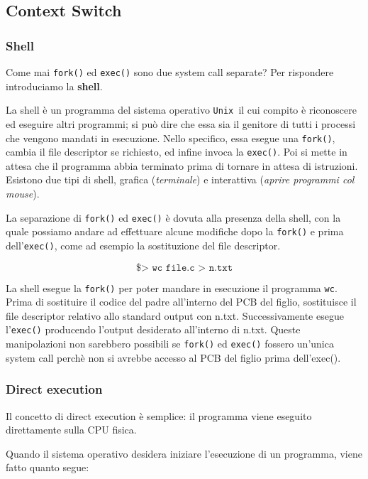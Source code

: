 \documentclass[12pt, letterpaper]{article}
\begin{document}
		\subsection{Context Switch}
		
			\subsubsection{Shell}
				
				Come mai \texttt{fork()} ed \texttt{exec()} sono due system call separate? Per rispondere introduciamo la \textbf{shell}.
				
				La shell è un programma del sistema operativo \texttt{Unix }il cui compito è riconoscere ed eseguire altri programmi; si può dire che essa sia il genitore di tutti i processi che vengono mandati in esecuzione. Nello specifico, essa esegue una \texttt{fork()}, cambia il file descriptor se richiesto, ed infine invoca la \texttt{exec()}. Poi si mette in attesa che il programma abbia terminato prima di tornare in attesa di istruzioni. Esistono due tipi di shell, grafica (\textit{terminale}) e interattiva (\textit{aprire programmi col mouse}). 
				
				La separazione di \texttt{fork()} ed \texttt{exec()} è dovuta alla presenza della shell, con la quale possiamo andare ad effettuare alcune modifiche dopo la \texttt{fork()} e prima dell'\texttt{exec()}, come ad esempio la sostituzione del file descriptor. 
				
				$$\texttt{\$> wc file.c > n.txt}$$
				
				La shell esegue la \texttt{fork()} per poter mandare in esecuzione il programma \texttt{wc}. Prima di sostituire il codice del padre all'interno del PCB del figlio, sostituisce il file descriptor relativo allo standard output con n.txt. Successivamente esegue l'\texttt{exec()} producendo l'output desiderato all'interno di n.txt. Queste manipolazioni non sarebbero possibili se \texttt{fork()} ed \texttt{exec()} fossero un'unica system call perchè non si avrebbe accesso al PCB del figlio prima dell'exec().
				
			\subsubsection{Direct execution}
			
				Il concetto di direct execution è semplice: il programma viene eseguito direttamente sulla CPU fisica.
				
				Quando il sistema operativo desidera iniziare l'esecuzione di un programma, viene fatto quanto segue: 
				
\end{document}
